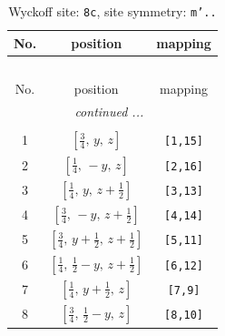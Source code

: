 \documentclass[fleqn,8pt]{jsarticle}
\begin{document}
\begin{longtable}{ccc}
\caption{Wyckoff site: {\tt 8c}, site symmetry: {\tt m'..}}
 \\
 \hline \hline
No. & position & mapping \\ \hline \endfirsthead

\multicolumn{2}{l}{\tablename\ \thetable{}} \\
 \hline \hline
No. & position & mapping \\ \hline \endhead

 \hline \hline
\multicolumn{2}{r}{\footnotesize\it continued ...} \\ \endfoot

 \hline \hline
\multicolumn{2}{r}{} \\ \endlastfoot

1 & $\left[ \frac{3}{4},\, y,\, z \right]$ & {\tt [1,15]} \\ \hline
2 & $\left[ \frac{1}{4},\, - y,\, z \right]$ & {\tt [2,16]} \\ \hline
3 & $\left[ \frac{1}{4},\, y,\, z + \frac{1}{2} \right]$ & {\tt [3,13]} \\ \hline
4 & $\left[ \frac{3}{4},\, - y,\, z + \frac{1}{2} \right]$ & {\tt [4,14]} \\ \hline
5 & $\left[ \frac{3}{4},\, y + \frac{1}{2},\, z + \frac{1}{2} \right]$ & {\tt [5,11]} \\ \hline
6 & $\left[ \frac{1}{4},\, \frac{1}{2} - y,\, z + \frac{1}{2} \right]$ & {\tt [6,12]} \\ \hline
7 & $\left[ \frac{1}{4},\, y + \frac{1}{2},\, z \right]$ & {\tt [7,9]} \\ \hline
8 & $\left[ \frac{3}{4},\, \frac{1}{2} - y,\, z \right]$ & {\tt [8,10]} \\
\end{longtable}
\renewcommand{\arraystretch}{1.2}
\end{document}
